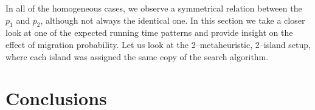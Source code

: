 \documentclass{sig-alternate}
\begin{document}
In all of the homogeneous cases, we observe a symmetrical relation between the $p_1$ and $p_2$, although not always the identical one.
In this section we take a closer look at one of the expected running time patterns and provide insight on the effect of migration probability.
Let us look at the 2--metaheuristic, 2--island setup, where each island was assigned the same copy of the search algorithm.



%


\section{Conclusions}



\end{document}
